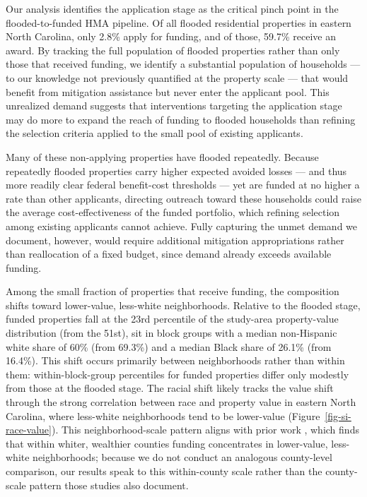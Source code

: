 \documentclass[
  authoryear,
  preprint]{elsarticle}
\begin{document}
Our analysis identifies the application stage as the critical pinch
point in the flooded-to-funded HMA pipeline. Of all flooded residential
properties in eastern North Carolina, only 2.8\% apply for funding, and
of those, 59.7\% receive an award. By tracking the full population of
flooded properties rather than only those that received funding, we
identify a substantial population of households --- to our knowledge not
previously quantified at the property scale --- that would benefit from
mitigation assistance but never enter the applicant pool. This
unrealized demand suggests that interventions targeting the application
stage may do more to expand the reach of funding to flooded households
than refining the selection criteria applied to the small pool of
existing applicants.

Many of these non-applying properties have flooded repeatedly. Because
repeatedly flooded properties carry higher expected avoided losses ---
and thus more readily clear federal benefit-cost thresholds --- yet are
funded at no higher a rate than other applicants, directing outreach
toward these households could raise the average cost-effectiveness of
the funded portfolio, which refining selection among existing applicants
cannot achieve. Fully capturing the unmet demand we document, however,
would require additional mitigation appropriations rather than
reallocation of a fixed budget, since demand already exceeds available
funding.

Among the small fraction of properties that receive funding, the
composition shifts toward lower-value, less-white neighborhoods.
Relative to the flooded stage, funded properties fall at the 23rd
percentile of the study-area property-value distribution (from the
51st), sit in block groups with a median non-Hispanic white share of
60\% (from 69.3\%) and a median Black share of 26.1\% (from 16.4\%).
This shift occurs primarily between neighborhoods rather than within
them: within-block-group percentiles for funded properties differ only
modestly from those at the flooded stage. The racial shift likely tracks
the value shift through the strong correlation between race and property
value in eastern North Carolina, where less-white neighborhoods tend to
be lower-value (Figure~\ref{fig-si-race-value}). This neighborhood-scale
pattern aligns with prior work
\citep{machManagedRetreatVoluntary2019, elliottRacialInequitiesFederal2020a},
which finds that within whiter, wealthier counties funding concentrates
in lower-value, less-white neighborhoods; because we do not conduct an
analogous county-level comparison, our results speak to this
within-county scale rather than the county-scale pattern those studies
also document.
\end{document}
